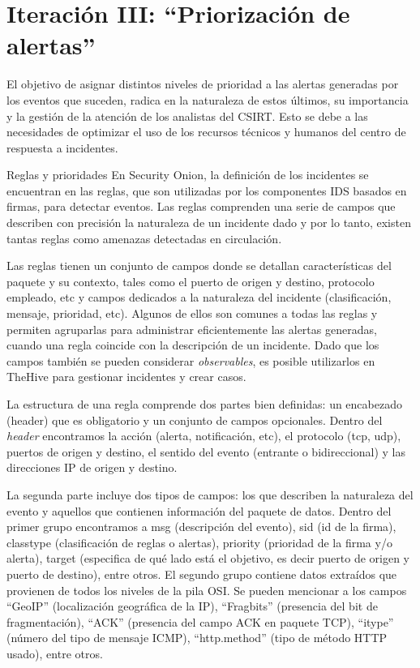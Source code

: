 \chapter{\Large Iteración III: “Priorización de alertas”}
    El objetivo de asignar distintos niveles de prioridad a las alertas generadas por los eventos que suceden, radica en la naturaleza de estos últimos, su importancia y la gestión de la atención de los analistas del CSIRT. Esto se debe a las necesidades de optimizar el uso de los recursos técnicos y humanos del centro de respuesta a incidentes. \par

    \begin{section}{Reglas y prioridades}
    En Security Onion, la definición de los incidentes se encuentran en las reglas, que son utilizadas por los componentes IDS basados en firmas, para detectar eventos. Las reglas comprenden una serie de campos que describen con precisión la naturaleza de un incidente dado y por lo tanto, existen tantas reglas como amenazas detectadas en circulación. \par
    Las reglas tienen un conjunto de campos donde se detallan características del paquete y su contexto, tales como el puerto de origen y destino, protocolo empleado, etc y campos dedicados a la naturaleza del incidente (clasificación, mensaje, prioridad, etc). Algunos de ellos son comunes a todas las reglas y permiten agruparlas para administrar eficientemente las alertas generadas, cuando una regla coincide con la descripción de un incidente. Dado que los campos también se pueden considerar \textit{observables}, es posible utilizarlos en TheHive para gestionar incidentes y crear casos. \par
    La estructura de una regla comprende dos partes bien definidas: un encabezado (header) que es obligatorio  y un conjunto de campos opcionales. Dentro del \textit{header} encontramos la acción (alerta, notificación, etc), el protocolo (tcp, udp), puertos de origen y destino, el sentido del evento (entrante o bidireccional) y las direcciones IP de origen y destino. \par
    La segunda parte incluye dos tipos de campos: los que describen la naturaleza del evento y aquellos que contienen información del paquete de datos. Dentro del primer grupo encontramos a msg (descripción del evento), sid (id de la firma), classtype (clasificación de reglas o alertas), priority (prioridad de la firma y/o alerta), target (especifica de qué lado está el objetivo, es decir puerto de origen y puerto de destino), entre otros. El segundo grupo contiene datos extraídos que provienen de todos los niveles de la pila OSI. Se pueden mencionar a los campos “GeoIP” (localización geográfica de la IP), “Fragbits” (presencia del bit de fragmentación), “ACK” (presencia del campo ACK en paquete TCP), “itype” (número del tipo de mensaje ICMP), “http.method” (tipo de método HTTP usado), entre otros.

\end{section}
